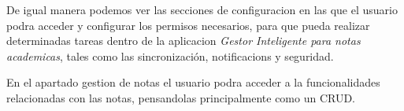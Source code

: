 \vspace{.5cm}

\noindent De igual manera podemos ver las secciones de configuracion en las que el usuario podra acceder y configurar los permisos necesarios, para que pueda realizar determinadas tareas dentro de la aplicacion \emph{Gestor Inteligente para notas academicas}, tales como las sincronización, notificacions y seguridad.

\noindent En el apartado gestion de notas el usuario podra acceder a la funcionalidades relacionadas con las notas, pensandolas principalmente como un CRUD. 